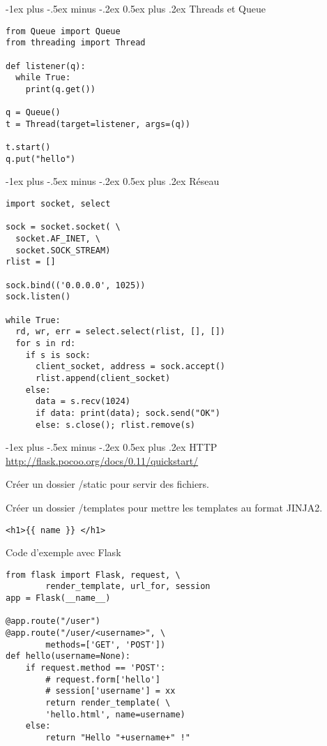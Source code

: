 \documentclass[10pt,landscape]{article}
\makeatletter
\renewcommand{\section}{\@startsection{section}{1}{0mm}%
                                {-1ex plus -.5ex minus -.2ex}%
                                {0.5ex plus .2ex}%
                                {\normalfont\large\bfseries}}
\makeatother
\begin{document}
\begin{multicols}{3}
\section{Threads et Queue}

\begin{verbatim}
from Queue import Queue
from threading import Thread

def listener(q):
  while True:
    print(q.get())

q = Queue()
t = Thread(target=listener, args=(q))

t.start()
q.put("hello")
\end{verbatim}

\section{Réseau}

\begin{verbatim}
import socket, select

sock = socket.socket( \
  socket.AF_INET, \
  socket.SOCK_STREAM)
rlist = []

sock.bind(('0.0.0.0', 1025))
sock.listen()

while True:
  rd, wr, err = select.select(rlist, [], [])
  for s in rd:
    if s is sock:
      client_socket, address = sock.accept()
      rlist.append(client_socket)
    else:
      data = s.recv(1024)
      if data: print(data); sock.send("OK")
      else: s.close(); rlist.remove(s)
\end{verbatim}

\section{HTTP}
\url{http://flask.pocoo.org/docs/0.11/quickstart/}

Créer un dossier /static pour servir des fichiers.

Créer un dossier /templates pour mettre les templates au format JINJA2.

\begin{verbatim}
<h1>{{ name }} </h1>
\end{verbatim}

Code d'exemple avec Flask

\begin{verbatim}
from flask import Flask, request, \
        render_template, url_for, session
app = Flask(__name__)

@app.route("/user")
@app.route("/user/<username>", \
        methods=['GET', 'POST'])
def hello(username=None):
    if request.method == 'POST':
        # request.form['hello']
        # session['username'] = xx
        return render_template( \
        'hello.html', name=username)
    else:
        return "Hello "+username+" !"


\end{verbatim}
\end{multicols}
\end{document}
